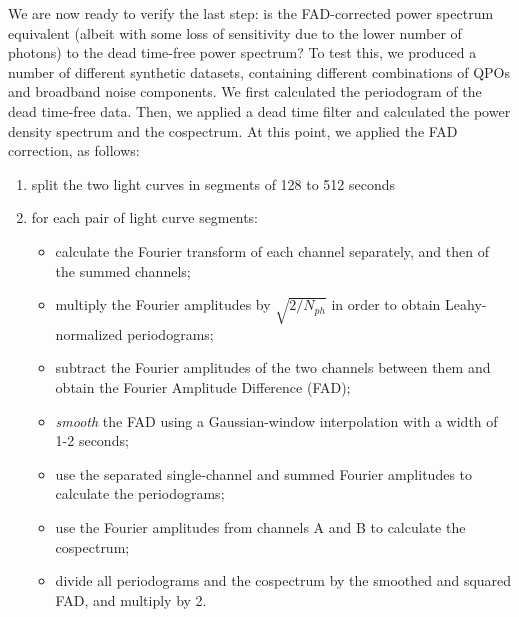 \documentclass[twocolumn]{aastex61}
\begin{document}
We are now ready to verify the last step: is the FAD-corrected power spectrum equivalent (albeit with some loss of sensitivity due to the lower number of photons) to the dead time-free power spectrum?
To test this, we produced a number of different synthetic datasets, containing different combinations of QPOs and broadband noise components. 
We first calculated the periodogram of the dead time-free data.
Then, we applied a dead time filter and calculated the power density spectrum and the cospectrum. 
At this point, we applied the FAD correction, as follows:
\begin{enumerate}
\item split the two light curves in segments of 128 to 512 seconds
\item for each pair of light curve segments: 
	\begin{itemize}
	\item calculate the Fourier transform of each channel separately, and then of the summed channels;
	\item multiply the Fourier amplitudes by $\sqrt{2/N_{ph}}$ in order to obtain Leahy-normalized periodograms;
	\item subtract the Fourier amplitudes of the two channels between them and obtain the Fourier Amplitude Difference (FAD);
	\item \textit{smooth} the FAD using a Gaussian-window interpolation with a width of 1-2 seconds;
	\item use the separated single-channel and summed Fourier amplitudes to calculate the periodograms;
	\item use the Fourier amplitudes from channels A and B to calculate the cospectrum;
	\item divide all periodograms and the cospectrum by the smoothed and squared FAD, and multiply by 2.
	\end{itemize}
\end{enumerate}
\end{document}
